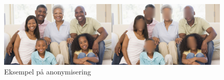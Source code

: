 \begin{figure}
\begin{center}
 \includegraphics[width=1\columnwidth]{bilder/Anonymisering/anonymisedFamily.png}
     \caption{Eksempel på anonymisering \label{fig:family}} 
\end{center}
\end{figure}
 
